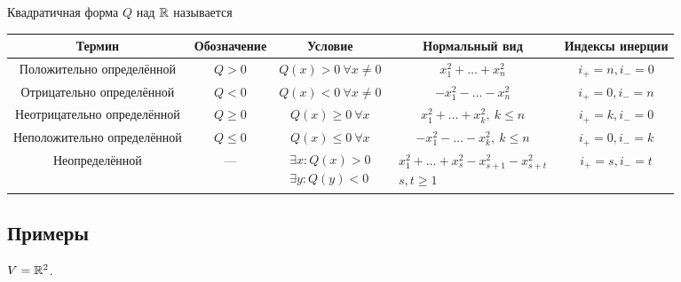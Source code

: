\begin{definition}
    Квадратичная форма $Q$ над $\mathbb{R}$ называется
\end{definition}
\begin{table}[H]
{\renewcommand{\arraystretch}{1.7}
    \begin{tabular}{c|c|c|c|c}
        Термин & Обозначение & Условие & Нормальный вид & Индексы инерции \\ \hline
        Положительно определённой & $Q > 0$ & $Q(x) > 0 \ \forall x \neq 0$ & $x_1^2 + \dots + x_n^2$ & $i_+ = n, i_- = 0$ \\ \hline
        Отрицательно определённой & $Q < 0$ & $Q(x) < 0 \ \forall x \neq 0$ & $-x_1^2 - \dots - x_n^2$ & $i_+ = 0, i_- = n$ \\ \hline
        Неотрицательно определённой & $Q \geq 0$ & $Q(x) \geq 0 \ \forall x$ & $x_1^2 + \dots + x_k^2, \ k \leq n$ & $i_+ = k, i_- = 0$ \\ \hline
        Неположительно определённой & $Q \leq 0$ & $Q(x) \leq 0 \ \forall x$ & $-x_1^2 - \dots - x_k^2, \ k \leq n$ & $i_+ = 0, i_- = k$ \\ \hline
        Неопределённой & --- & 
        \begin{math}
            \begin{aligned}
                \exists x : Q(x) > 0 \\
                \exists y : Q(y) < 0
            \end{aligned}
        \end{math} &
        \begin{math}
            \begin{gathered}
                x_1^2 + \dots + x_s ^2 - x_{s + 1}^2 - x_{s + t}^2 \\
                s, t \geq 1
            \end{gathered}
        \end{math} & $i_+ = s, i_- = t$
        \\ \hline
    \end{tabular}       
}
\end{table}


\subsection{Примеры}

$V = \mathbb{R}^2$.

